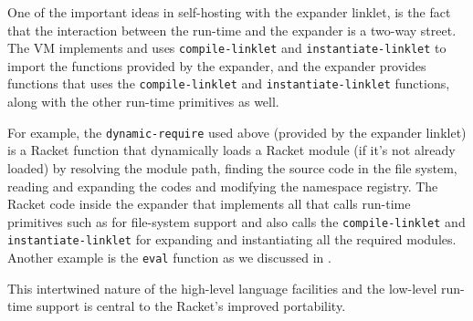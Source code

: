 One of the important ideas in self-hosting with the expander linklet,
is the fact that the interaction between the run-time and the expander
is a two-way street. The VM implements and uses \verb|compile-linklet|
and \verb|instantiate-linklet| to import the functions provided by the
expander, and the expander provides functions that uses the
\verb|compile-linklet| and \verb|instantiate-linklet| functions, along
with the other run-time primitives as well.

For example, the \verb|dynamic-require| used above (provided by the
expander linklet) is a Racket function that dynamically loads a Racket
module (if it's not already loaded) by resolving the module path,
finding the source code in the file system, reading and expanding the
codes and modifying the namespace registry. The Racket code inside the
expander that implements all that calls run-time primitives such as
for file-system support and also calls the \verb|compile-linklet| and
\verb|instantiate-linklet| for expanding and instantiating all the
required modules. Another example is the \verb|eval| function as we
discussed in .

This intertwined nature of the high-level language facilities and the
low-level run-time support is central to the Racket's improved
portability.
